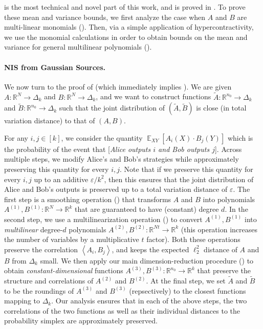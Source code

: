 \documentclass[11pt]{article}
\newcommand{\inangle}[1]{\left \langle #1 \right \rangle}
\DeclareMathOperator*{\Ex}{\mathbb{E}}
\newcommand{\wtilde}[1]{\widetilde{#1}}
\newcommand{\eps}{\varepsilon}
\newcommand{\bbR}{{\mathbb R}}
\begin{document}
 is the most technical and novel part of this work, and is proved in . To prove these mean and variance bounds, we first analyze the case when $A$ and $B$ are multi-linear monomials (). Then, via a simple application of hypercontractivity, we use the monomial calculations in order to obtain bounds on the mean and variance for general multilinear polynomials ().

\paragraph{NIS from Gaussian Sources.} We now turn to the proof of  (which immediately implies ). We are given $A : \bbR^N \to \Delta_k$ and $B : \bbR^N \to \Delta_k$, and we want to construct functions $\wtilde{A} : \bbR^{n_0} \to \Delta_k$ and $\wtilde{B} : \bbR^{n_0} \to \Delta_k$ such that the joint distribution of $(\wtilde{A}, \wtilde{B})$ is close (in total variation distance) to that of $(A,B)$.

For any $i, j \in [k]$, we consider the quantity $\Ex_{XY} [A_i(X) \cdot B_j(Y)]$ which is the probability of the event that [{\em Alice outputs $i$ and Bob outputs $j$}]. Across multiple steps, we modify Alice's and Bob's strategies while approximately preserving this quantity for every $i, j$. Note that if we preserve this quantity for every $i, j$ up to an additive $\eps/k^2$, then this ensures that the joint distribution of Alice and Bob's outputs is preserved up to a total variation distance of $\eps$. The first step is a smoothing operation () that transforms $A$ and $B$ into polynomials $A^{(1)}, B^{(1)}: \bbR^N \to \bbR^k$ that are guaranteed to have (constant) degree $d$. In the second step, we use a multilinearization operation () to convert $A^{(1)}, B^{(1)}$ into \emph{multilinear} degree-$d$ polynomials $A^{(2)}, B^{(2)} : \bbR^{Nt} \to \bbR^k$ (this operation increases the number of variables by a multiplicative $t$ factor). Both these operations preserve the correlation $\inangle{A_i, B_j}$, and keeps the expected $\ell_2^2$ distance of $A$ and $B$ from $\Delta_k$ small. We then apply our main dimension-reduction procedure () to obtain \emph{constant-dimensional} functions $A^{(3)}, B^{(3)} : \bbR^{n_0} \to \bbR^k$ that preserve the structure and correlations of $A^{(2)}$ and $B^{(2)}$. At the final step, we set $\wtilde{A}$ and $\wtilde{B}$ to be the roundings of $A^{(3)}$ and $B^{(3)}$ (repsectively) to the closest functions mapping to $\Delta_k$. Our analysis ensures that in each of the above steps, the two correlations of the two functions as well as their individual distances to the probability simplex are approximately preserved.
\end{document}
